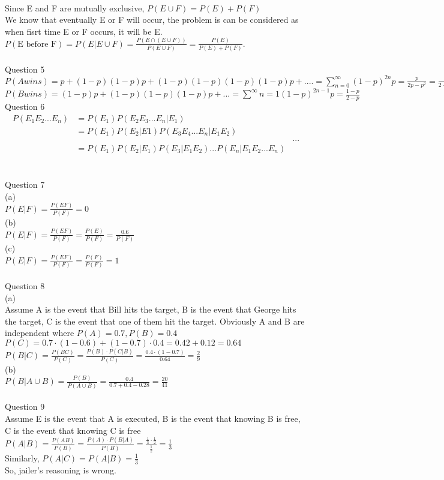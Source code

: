 \documentclass[12pt]{article}
\begin{document}
\\
{Since E and F are mutually exclusive, }$P(E\cup F)=P(E)+P(F)$ 
\\
{We know that eventually E or F will occur, the problem is can be considered as when fisrt time E or F occurs, it will be E.}
\\
$P(\mbox{E before F})=P(E|E\cup F)=\frac{P(E\cap(E\cup F))}{P(E\cup F)}=\frac{P(E)}{P(E)+P(F)}.$
\\
\\
{Question 5}
\\
$P(Awins)=p+(1-p)(1-p)p+(1-p)(1-p)(1-p)(1-p)p+....=\sum^{\infty}_{n=0}(1-p)^{2n}p=\frac{p}{2p-p^{2}}=\frac{1}{2-p}$
\\
$P(Bwins)=(1-p)p+(1-p)(1-p)(1-p)p+...=\sum^{\infty}{n=1}(1-p)^{2n-1}p=\frac{1-p}{2-p}$
\\
{Question 6}
\\
\begin{equation}
\begin{aligned}
P(E_{1}E_{2}...E_{n})&=P(E_{1})P(E_{2}E_{3}...E_{n}|E_{1})\\
&=P(E_{1})P(E_{2}|E{1})P(E_{3}E_{4}...E_{n}|E_{1}E_{2})\\
&
&...\\
&=P(E_{1})P(E_{2}|E_{1})P(E_{3}|E_{1}E_{2})...P(E_{n}|E_{1}E_{2}...E_{n})
\end{aligned}
\end{equation}
\\
\\
{Question 7}
\\
{(a)}
\\
$P(E|F)=\frac{P(EF)}{P(F)}=0$
\\
{(b)}
\\
$P(E|F)=\frac{P(EF)}{P(F)}=\frac{P(E)}{P(F)}=\frac{0.6}{P(F)}$
\\
{(c)}\\
$P(E|F)=\frac{P(EF)}{P(F)}=\frac{P(F)}{P(F)}=1$
\\
\\
{Question 8}
\\
{(a)}
\\
{Assume A is the event that Bill hits the target, B is the event that George hits the target, C is the event that one of them hit the target. Obviously A and B are independent where }$P(A)=0.7, P(B)=0.4$\\
$P(C)=0.7\cdot(1-0.6)+(1-0.7)\cdot0.4=0.42+0.12=0.64$
\\
$P(B|C)=\frac{P(BC)}{P(C)}=\frac{P(B)\cdot P(C|B)}{P(C)}=\frac{0.4\cdot(1-0.7)}{0.64}=\frac{2}{9}$
\\
{(b)}
\\
$P(B|A\cup B)=\frac{P(B)}{P(A\cup B)}=\frac{0.4}{0.7+0.4-0.28}=\frac{20}{41}$
\\
\\
{Question 9}
\\
{Assume E is the event that A is executed, B is the event that knowing B is free, C is the event that knowing C is free}
$P(A|B)=\frac{P(AB)}{P(B)}=\frac{P(A)\cdot P(B|A)}{P(B)}=\frac{\frac{1}{3}\cdot\frac{1}{2}}{\frac{1}{2}}=\frac{1}{3}$\\
{Similarly, }
$P(A|C)=P(A|B)=\frac{1}{3}$
\\
{So, jailer's reasoning is wrong.}
\end{document}
